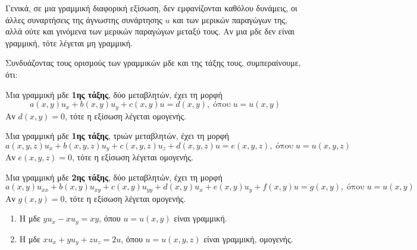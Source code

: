 \begin{rem}
  Γενικά, σε μια γραμμική διαφορική εξίσωση, δεν εμφανίζονται καθόλου δυνάμεις, οι άλλες 
  συναρτήσεις της άγνωστης συνάρτησης $ u $ και των μερικών παραγώγων της, αλλά ούτε και
  γινόμενα των μερικών παραγώγων μεταξύ τους. Αν μια μδε δεν είναι γραμμική, τότε 
  λέγεται \textcolor{Col1}{μη γραμμική}.
\end{rem}

\begin{rem} \item {}
  Συνδυάζοντας τους ορισμούς των γραμμικών μδε και της τάξης τους, συμπεραίνουμε, ότι:
  \begin{myitemize}
    \item Μια γραμμική μδε \textbf{1ης τάξης}, δύο μεταβλητών, έχει τη μορφή
      \begin{equation} 
        a(x,y) u_{x} + b(x,y)u_{y} + c(x,y)u = d(x,y), \; \text{όπου} \; u=u(x,y) 
      \end{equation}
      Αν $ d(x,y)=0 $, τότε η εξίσωση λέγεται \textcolor{Col1}{ομογενής}.
    \item Μια γραμμική μδε \textbf{1ης τάξης}, τριών μεταβλητών, έχει τη μορφή
      \begin{equation} 
        a(x,y,z) u_{x} + b(x,y,z)u_{y} + c(x,y,z)u_{z} + d(x,y,z)u = e(x,y,z), 
        \; \text{όπου} \; u=u(x,y,z)  
      \end{equation} 
      Αν $ e(x,y,z)=0 $, τότε η εξίσωση λέγεται \textcolor{Col1}{ομογενής}.
    \item Μια γραμμική μδε \textbf{2ης τάξης}, δύο μεταβλητών, έχει τη μορφή
      \begin{equation} 
        a(x,y)u_{xx} + b(x,y)u_{xy} + c(x,y)u_{yy} + d(x,y)u_{x} + e(x,y)u_{y} +
        f(x,y)u =g(x,y), \; \text{όπου} \; u=u(x,y) 
      \end{equation} 
      Αν $ g(x,y)=0 $, τότε η εξίσωση λέγεται \textcolor{Col1}{ομογενής}.
  \end{myitemize}
\end{rem}

\begin{examples} \item {}
  \begin{enumerate}
    \item Η μδε $ yu_{x}-xu_{y}=xy $, όπου $ u=u(x,y) $  είναι γραμμική.
    \item Η μδε $ xu_{x}+yu_{y}+zu_{z}=2u $, όπου $ u=u(x,y,z) $  είναι γραμμική,
      ομογενής.
  \end{enumerate}
\end{examples}


